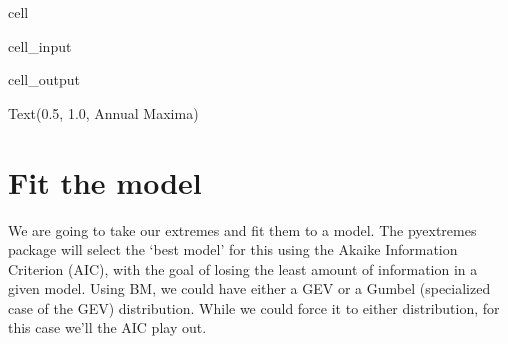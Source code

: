 \documentclass[letterpaper,10pt,english]{jupyterBook}
\begin{document}
\begin{sphinxuseclass}{cell}\begin{sphinxVerbatimInput}

\begin{sphinxuseclass}{cell_input}
\begin{sphinxVerbatim}[commandchars=\\\{\}]
   
\end{sphinxVerbatim}

\end{sphinxuseclass}\end{sphinxVerbatimInput}
\begin{sphinxVerbatimOutput}

\begin{sphinxuseclass}{cell_output}
\begin{sphinxVerbatim}[commandchars=\\\{\}]
Text(0.5, 1.0, \PYGZsq{}Annual Maxima\PYGZsq{})
\end{sphinxVerbatim}

\noindent{}

\end{sphinxuseclass}\end{sphinxVerbatimOutput}

\end{sphinxuseclass}

\part{Fit the model}
\label{\detokenize{notebooks/regional_and_local/SL_Extremes_annual:fit-the-model}}
\sphinxAtStartPar
We are going to take our extremes and fit them to a model. The pyextremes package will select the ‘best model’ for this using the Akaike Information Criterion (AIC), with the goal of losing the least amount of information in a given model. Using BM, we could have either a GEV or a Gumbel (specialized case of the GEV) distribution. While we could force it to either distribution, for this case we’ll the AIC play out.
\end{document}
